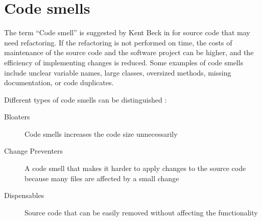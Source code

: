 \section{Code smells}\label{sec:code_smell}

The term \enquote{Code smell} is suggested by Kent Beck in \cite{fowler2019refactoring} for source code that may need refactoring. If the refactoring is not performed on time, the costs of maintenance of the source code and the software project can be higher, and the efficiency of implementing changes is reduced. Some examples of code smells include unclear variable names, large classes, oversized methods, missing documentation, or code duplicates. 

Different types of code smells can be distinguished \cite{data_clumps_refactoring_guru}:
\begin{description}
    \item [Bloaters] Code smells increases the code size unnecessarily 
    \item [Change Preventers] A code smell that makes it harder to apply changes to the source code because many files are affected by a small change
    \item [Dispensables] Source code that can be easily removed without affecting the functionality
\end{description}